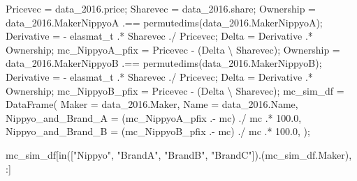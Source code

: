 \documentclass[
  letterpaper,
  DIV=11,
  numbers=noendperiod]{scrreprt}
\newenvironment{Shaded}{\begin{snugshade}}{\end{snugshade}}
\newcommand{\FloatTok}[1]{\textcolor[rgb]{0.68,0.00,0.00}{#1}}
\newcommand{\FunctionTok}[1]{\textcolor[rgb]{0.28,0.35,0.67}{#1}}
\newcommand{\NormalTok}[1]{\textcolor[rgb]{0.00,0.23,0.31}{#1}}
\newcommand{\OperatorTok}[1]{\textcolor[rgb]{0.37,0.37,0.37}{#1}}
\newcommand{\StringTok}[1]{\textcolor[rgb]{0.13,0.47,0.30}{#1}}
\begin{document}
\begin{Shaded}
\begin{Highlighting}[]
\NormalTok{Pricevec }\OperatorTok{=}\NormalTok{ data\_2016.price;}
\NormalTok{Sharevec }\OperatorTok{=}\NormalTok{ data\_2016.share;}
\NormalTok{Ownership }\OperatorTok{=}\NormalTok{ data\_2016.MakerNippyoA }\OperatorTok{.==} \FunctionTok{permutedims}\NormalTok{(data\_2016.MakerNippyoA);}
\NormalTok{Derivative }\OperatorTok{=} \OperatorTok{{-}}\NormalTok{ elasmat\_t }\OperatorTok{.*}\NormalTok{ Sharevec}\OperatorTok{\textquotesingle{}} \OperatorTok{./}\NormalTok{ Pricevec;}
\NormalTok{Delta }\OperatorTok{=}\NormalTok{ Derivative }\OperatorTok{.*}\NormalTok{ Ownership;}
\NormalTok{mc\_NippyoA\_pfix }\OperatorTok{=}\NormalTok{ Pricevec }\OperatorTok{{-}}\NormalTok{ (Delta }\OperatorTok{\textbackslash{}}\NormalTok{ Sharevec);}
\NormalTok{Ownership }\OperatorTok{=}\NormalTok{ data\_2016.MakerNippyoB }\OperatorTok{.==} \FunctionTok{permutedims}\NormalTok{(data\_2016.MakerNippyoB);}
\NormalTok{Derivative }\OperatorTok{=} \OperatorTok{{-}}\NormalTok{ elasmat\_t }\OperatorTok{.*}\NormalTok{ Sharevec}\OperatorTok{\textquotesingle{}} \OperatorTok{./}\NormalTok{ Pricevec;}
\NormalTok{Delta }\OperatorTok{=}\NormalTok{ Derivative }\OperatorTok{.*}\NormalTok{ Ownership;}
\NormalTok{mc\_NippyoB\_pfix }\OperatorTok{=}\NormalTok{ Pricevec }\OperatorTok{{-}}\NormalTok{ (Delta }\OperatorTok{\textbackslash{}}\NormalTok{ Sharevec);}
\NormalTok{mc\_sim\_df }\OperatorTok{=} \FunctionTok{DataFrame}\NormalTok{(}
\NormalTok{    Maker }\OperatorTok{=}\NormalTok{ data\_2016.Maker, }
\NormalTok{    Name }\OperatorTok{=}\NormalTok{ data\_2016.Name, }
\NormalTok{    Nippyo\_and\_Brand\_A }\OperatorTok{=}\NormalTok{ (mc\_NippyoA\_pfix }\OperatorTok{.{-}}\NormalTok{ mc) }\OperatorTok{./}\NormalTok{ mc }\OperatorTok{.*} \FloatTok{100.0}\NormalTok{,}
\NormalTok{    Nippyo\_and\_Brand\_B }\OperatorTok{=}\NormalTok{ (mc\_NippyoB\_pfix }\OperatorTok{.{-}}\NormalTok{ mc) }\OperatorTok{./}\NormalTok{ mc }\OperatorTok{.*} \FloatTok{100.0}\NormalTok{,}
\NormalTok{);}

\NormalTok{mc\_sim\_df[}\FunctionTok{in}\NormalTok{([}\StringTok{"Nippyo"}\NormalTok{, }\StringTok{"BrandA"}\NormalTok{, }\StringTok{"BrandB"}\NormalTok{, }\StringTok{"BrandC"}\NormalTok{]).(mc\_sim\_df.Maker), }\OperatorTok{:}\NormalTok{]}
\end{Highlighting}
\end{Shaded}
\end{document}
